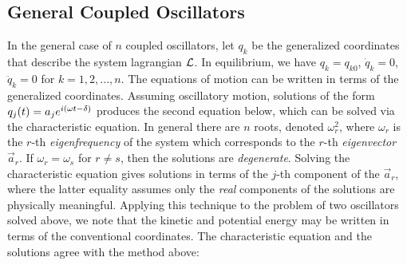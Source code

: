 \subsection{General Coupled Oscillators}
In the general case of $n$ coupled oscillators, let $q_k$ be the generalized coordinates that describe the system lagrangian $\mathcal{L}$. In equilibrium, we have $q_k=q_{k0}$, $\dot{q}_k=0$, $\ddot{q}_k=0$ for $k=1,2,...,n$. 
The equations of motion can be written in terms of the generalized coordinates. Assuming oscillatory motion, solutions of the form $q_j (t)= a_j e^{i\left(\omega t - \delta\right)}$ produces the second equation below, which can be solved via the characteristic equation. 
In general there are $n$ roots, denoted $\omega^2_r$, where $\omega_r$ is the $r$-th \textit{eigenfrequency} of the system which corresponds to the $r$-th \textit{eigenvector} $\vec{a}_r$. If $\omega_r=\omega_s$ for $r\neq s$, then the solutions are \textit{degenerate}. Solving the characteristic equation gives solutions in terms of the $j$-th component of the $\vec{a}_r$, where the latter equality assumes only the \textit{real} components of the solutions are physically meaningful.
Applying this technique to the problem of two oscillators solved above, we note that the kinetic and potential energy may be written in terms of the conventional coordinates. The characteristic equation and the solutions agree with the method above:
